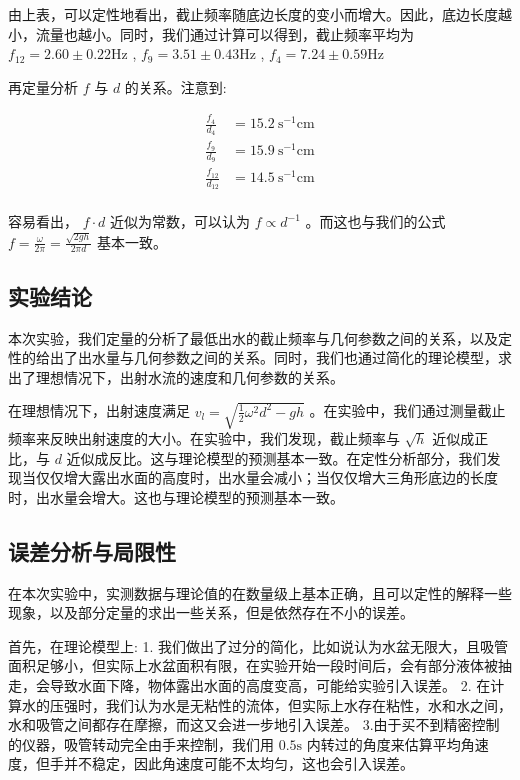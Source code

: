 \documentclass[fontset=windows]{article}
\begin{document}
由上表，可以定性地看出，截止频率随底边长度的变小而增大。因此，底边长度越小，流量也越小。同时，我们通过计算可以得到，截止频率平均为 $f_{12} = 2.60 \pm 0.22 \text{Hz} $ , $f_9 = 3.51 \pm 0.43 \text{Hz}$ , $f_{4} = 7.24 \pm 0.59 \text{Hz}$

再定量分析 $f$ 与 $d$ 的关系。注意到:

$$
\begin{aligned}
    \frac{f_4}{d_4} &= 15.2 \ \text{s}^{-1} \text{cm} \\
    \frac{f_9}{d_9} &= 15.9 \ \text{s}^{-1} \text{cm} \\
    \frac{f_{12}}{d_{12}} &= 14.5 \ \text{s}^{-1} \text{cm} \\
\end{aligned}
$$

容易看出， $f \cdot d$ 近似为常数，可以认为 $f \propto d^{-1}$ 。而这也与我们的公式 $f = \frac{\omega}{2\pi} = \frac{\sqrt{2gh}}{2\pi d}$ 基本一致。


\subsection{实验结论}

本次实验，我们定量的分析了最低出水的截止频率与几何参数之间的关系，以及定性的给出了出水量与几何参数之间的关系。同时，我们也通过简化的理论模型，求出了理想情况下，出射水流的速度和几何参数的关系。

在理想情况下，出射速度满足 $v_l = \sqrt{\frac{1}{2}\omega^2 d^2 - gh}$ 。在实验中，我们通过测量截止频率来反映出射速度的大小。在实验中，我们发现，截止频率与 $\sqrt{h}$ 近似成正比，与 $d$ 近似成反比。这与理论模型的预测基本一致。在定性分析部分，我们发现当仅仅增大露出水面的高度时，出水量会减小；当仅仅增大三角形底边的长度时，出水量会增大。这也与理论模型的预测基本一致。

\subsection{误差分析与局限性}

在本次实验中，实测数据与理论值的在数量级上基本正确，且可以定性的解释一些现象，以及部分定量的求出一些关系，但是依然存在不小的误差。

首先，在理论模型上:  1. 我们做出了过分的简化，比如说认为水盆无限大，且吸管面积足够小，但实际上水盆面积有限，在实验开始一段时间后，会有部分液体被抽走，会导致水面下降，物体露出水面的高度变高，可能给实验引入误差。 2. 在计算水的压强时，我们认为水是无粘性的流体，但实际上水存在粘性，水和水之间，水和吸管之间都存在摩擦，而这又会进一步地引入误差。 3.由于买不到精密控制的仪器，吸管转动完全由手来控制，我们用 $0.5\text{s}$ 内转过的角度来估算平均角速度，但手并不稳定，因此角速度可能不太均匀，这也会引入误差。
\end{document}
